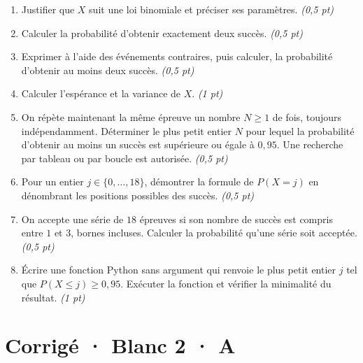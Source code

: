 \begin{enumerate}

\item Justifier que $X$ suit une loi binomiale et préciser ses paramètres. \hfill\textit{(0,5 pt)}

\item Calculer la probabilité d'obtenir exactement deux succès. \hfill\textit{(0,5 pt)}

\item Exprimer à l'aide des événements contraires, puis calculer, la probabilité d'obtenir au moins deux succès. \hfill\textit{(0,5 pt)}

\item Calculer l'espérance et la variance de $X$. \hfill\textit{(1 pt)}

\item On répète maintenant la même épreuve un nombre $N\ge1$ de fois, toujours indépendamment. Déterminer le plus petit entier $N$ pour lequel la probabilité d'obtenir au moins un succès est supérieure ou égale à $0{,}95$. Une recherche par tableau ou par boucle est autorisée. \hfill\textit{(0,5 pt)}

\item Pour un entier $j\in\{0,\ldots,18\}$, démontrer la formule de $P(X=j)$ en dénombrant les positions possibles des succès. \hfill\textit{(0,5 pt)}

\item On accepte une série de $18$ épreuves si son nombre de succès est compris entre $1$ et $3$, bornes incluses. Calculer la probabilité qu'une série soit acceptée. \hfill\textit{(0,5 pt)}

\item Écrire une fonction Python sans argument qui renvoie le plus petit entier $j$ tel que $P(X\le j)\ge0{,}95$. Exécuter la fonction et vérifier la minimalité du résultat. \hfill\textit{(1 pt)}

\end{enumerate}

\ifprof\clearpage

\section*{Corrigé · Blanc 2 · A}\label{cor:8-3}

